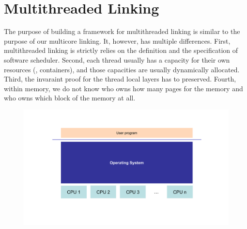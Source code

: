 \section{Multithreaded Linking}
\label{chapter:linking:sec:multithreaded-linking}

The purpose of building a framework for multithreaded linking is similar to 
the purpose of our multicore linking. 
It, however, has multiple differences. 
First, multithreaded linking is 
strictly relies on the definition and the specification of software scheduler.
Second, each thread usually has a capacity for their own resources (\eg, containers),
and those capacities are usually dynamically allocated. 
Third, the invaraint proof for the thread local layers has to preserved. 
Fourth, within memory, we do not know who owns how many pages for the memory 
and who owns which block of the memory at all. 



\begin{figure}
\begin{center}
\includegraphics[width=\textwidth, page=21]{figs/conlink/concurrent_linking}
\end{center}
\end{figure}


%



